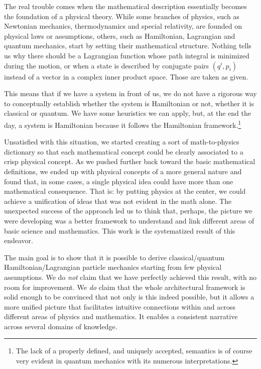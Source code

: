\documentclass[smallextended]{svjour3}
\numberwithin{equation}{section}
\theoremstyle{definition}
\begin{document}
The real trouble comes when the mathematical description essentially becomes the foundation of a physical theory. While some branches of physics, such as Newtonian mechanics, thermodynamics and special relativity, are founded on physical laws or assumptions, others, such as Hamiltonian, Lagrangian and quantum mechanics, start by setting their mathematical structure. Nothing tells us why there should be  a Lagrangian function whose path integral is minimized during the motion, or when a state is described by conjugate pairs $(q^i, p_i)$ instead of a vector in a complex inner product space. Those are taken as given.

This means that if we have a system in front of us, we do not have a rigorous way to conceptually establish whether the system is Hamiltonian or not, whether it is classical or quantum. We have some heuristics we can apply, but, at the end the day, a system is Hamiltonian because it follows the Hamiltonian framework.\footnote{The lack of a properly defined, and uniquely accepted, semantics is of course very evident in quantum mechanics with its numerous interpretations.}

Unsatisfied with this situation, we started creating a sort of math-to-physics dictionary so that each mathematical concept could be clearly associated to a crisp physical concept. As we pushed further back toward the basic mathematical definitions, we ended up with physical concepts of a more general nature and found that, in some cases, a single physical idea could have more than one mathematical consequence. That is: by putting physics at the center, we could achieve a unification of ideas that was not evident in the math alone. The unexpected success of the approach led us to think that, perhaps, the picture we were developing was a better framework to understand and link different areas of basic science and mathematics. This work is the systematized result of this endeavor.


The main goal is to show that it is possible to derive classical/quantum Hamiltonian/Lagrangian particle mechanics starting from few physical assumptions. We do \emph{not} claim that we have perfectly achieved this result, with no room for improvement. We \emph{do} claim that the whole architectural framework is solid enough to be convinced that not only is this indeed possible, but it allows a more unified picture that facilitates intuitive connections within and across different areas of physics and mathematics. It enables a consistent narrative across several domains of knowledge.
\end{document}
